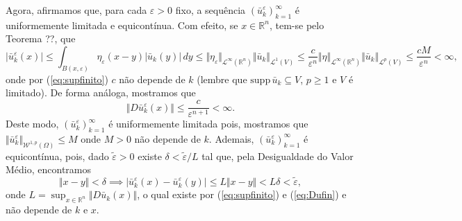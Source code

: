 \documentclass[a4paper, 11pt]{book}
\theoremstyle{definition}
\newcommand{\bR}{\mathbb{R}}
\newcommand{\cL}{\mathcal{L}}
\newcommand{\cW}{\mathcal{W}}
\newcommand{\supp}{\mathrm{supp}\,}
\begin{document}
\begin{prf}
    Agora, afirmamos que, para cada $\varepsilon > 0$ fixo, a sequência $(\bar u_k^\varepsilon)_{k=1}^\infty$ é uniformemente limitada e equicontínua.
    Com efeito, se $x \in \bR^n$, tem-se pelo Teorema ??, que
    \begin{equation} \label{eq:ufin}
        |\bar u_k^\varepsilon(x)| \leqslant \int_{B(x,\varepsilon)} \eta_\varepsilon (x - y) |\bar u_k(y)| \,dy \leqslant \Vert \eta_\varepsilon \Vert_{\cL^\infty(\bR^n)} \Vert \bar u_k \Vert_{\cL^1(V)} \leqslant \frac{c}{\varepsilon^n} \Vert \eta \Vert_{\cL^\infty(\bR^n)} \Vert \bar u_k \Vert_{\cL^p(V)} \leqslant \frac{cM}{\varepsilon^n} < \infty,
    \end{equation}
    onde por (\ref{eq:supfinito}) $c$ não depende de $k$ (lembre que $\supp \bar u_k \subseteq V$, $p \geqslant 1$ e $V$ é limitado). De forma análoga, mostramos que
    \begin{equation} \label{eq:Dufin}
        \Vert D\bar u_k^\varepsilon(x) \Vert  \leqslant \frac{c}{\varepsilon^{n+1}} < \infty.
    \end{equation}
    Deste modo, $(\bar u_k^\varepsilon)_{k=1}^\infty$ é uniformemente limitada pois, mostramos que $\Vert \bar u_k^\varepsilon \Vert_{\cW^{1,p}(\Omega)}\leqslant M$ onde $M > 0$ não depende de $k$.
    Ademais, $(\bar u_k^\varepsilon)_{k=1}^\infty$ é equicontínua, pois, dado $\tilde\varepsilon > 0$ existe $\delta < \tilde\varepsilon / L$ tal que, pela Desigualdade do Valor Médio, encontramos
    \[
        \Vert x - y \Vert < \delta \implies |\bar u_k^\varepsilon(x) - \bar u_k^\varepsilon(y)| \leqslant L \Vert x - y \Vert < L \delta < \tilde\varepsilon,
    \]
    onde $L = \sup_{x \in \bR^n} \Vert D\bar u_k(x) \Vert$, o qual existe por (\ref{eq:supfinito}) e (\ref{eq:Dufin}) e não depende de $k$ e $x$.


\end{prf}
\end{document}
